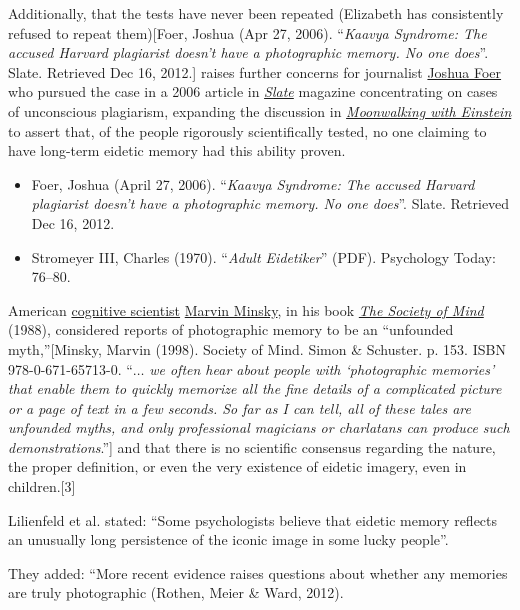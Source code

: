 \documentclass{book}
\numberwithin{equation}{section}
\begin{document}
Additionally, that the tests have never been repeated (Elizabeth has consistently refused to repeat them)[Foer, Joshua (Apr 27, 2006). ``\textit{Kaavya Syndrome: The accused Harvard plagiarist doesn't have a photographic memory. No one does}''. Slate. Retrieved Dec 16, 2012.] raises further concerns for journalist \href{https://en.wikipedia.org/wiki/Joshua_Foer}{Joshua Foer} who pursued the case in a 2006 article in \href{https://en.wikipedia.org/wiki/Slate_(magazine)}{\textit{Slate}} magazine concentrating on cases of unconscious plagiarism, expanding the discussion in \href{https://en.wikipedia.org/wiki/Moonwalking_with_Einstein}{\textit{Moonwalking with Einstein}} to assert that, of the people rigorously scientifically tested, no one claiming to have long-term eidetic memory had this ability proven.
\begin{itemize}
    \item Foer, Joshua (April 27, 2006). ``\textit{Kaavya Syndrome: The accused Harvard plagiarist doesn't have a photographic memory. No one does}''. Slate. Retrieved Dec 16, 2012.
    \item Stromeyer III, Charles (1970). ``\textit{Adult Eidetiker}'' (PDF). Psychology Today: 76--80.
\end{itemize}
%
American \href{https://en.wikipedia.org/wiki/Cognitive_scientist}{cognitive scientist} \href{https://en.wikipedia.org/wiki/Marvin_Minsky}{Marvin Minsky}, in his book \href{https://en.wikipedia.org/wiki/Society_of_Mind}{\textit{The Society of Mind}} (1988), considered reports of photographic memory to be an ``unfounded myth,''[Minsky, Marvin (1998). Society of Mind. Simon \& Schuster. p. 153. ISBN 978-0-671-65713-0. ``$\ldots$ \textit{we often hear about people with `photographic memories' that enable them to quickly memorize all the fine details of a complicated picture or a page of text in a few seconds. So far as I can tell, all of these tales are unfounded myths, and only professional magicians or charlatans can produce such demonstrations}.''] and that there is no scientific consensus regarding the nature, the proper definition, or even the very existence of eidetic imagery, even in children.[3]

%
Lilienfeld et al. stated: ``Some psychologists believe that eidetic memory reflects an unusually long persistence of the iconic image in some lucky people''.

They added: ``More recent evidence raises questions about whether any memories are truly photographic (Rothen, Meier \& Ward, 2012).
\end{document}
